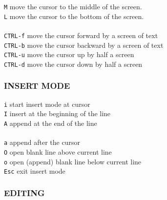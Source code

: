 \documentclass[10pt,a4paper,landscape]{article}
\begin{document}
\begin{multicols}{3}
    \colorbox{gray!20}{\lstinline{M}}                   move the cursor to the middle of the screen. \\
    \colorbox{gray!20}{\lstinline{L}}                   move the cursor to the bottom of the screen. \\
\\
    \colorbox{gray!20}{\lstinline{CTRL-f}}              move the cursor forward by a screen of text \\
    \colorbox{gray!20}{\lstinline{CTRL-b}}              move the cursor backward by a screen of text \\
    \colorbox{gray!20}{\lstinline{CTRL-u}}              move the cursor up by half a screen \\
    \colorbox{gray!20}{\lstinline{CTRL-d}}              move the cursor down by half a screen \\
    
    
    \subsubsection*{
    INSERT MODE
    }
    
    \colorbox{gray!20}{\lstinline{i}}                   start insert mode at cursor \\
    \colorbox{gray!20}{\lstinline{I}}                   insert at the beginning of the line \\
    \colorbox{gray!20}{\lstinline{A}}                   append at the end of the line \\
 \\
    \colorbox{gray!20}{\lstinline{a}}                   append after the cursor \\
    \colorbox{gray!20}{\lstinline{O}}                   open blank line above current line \\
    \colorbox{gray!20}{\lstinline{o}}                   open (append) blank line below current line \\
    \colorbox{gray!20}{\lstinline{Esc}}                 exit insert mode \\
    
    
    \subsubsection*{
    EDITING
    }
    

\end{multicols}
\end{document}

